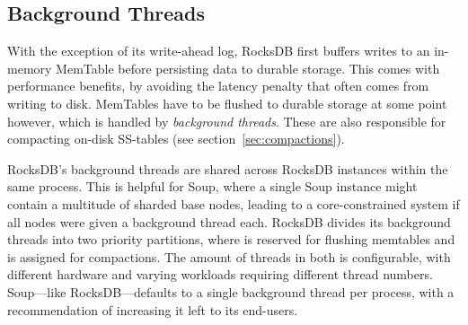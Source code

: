 \subsection{Background Threads}

With the exception of its write-ahead log, RocksDB first buffers writes to an
in-memory MemTable before persisting data to durable storage. This comes with
performance benefits, by avoiding the latency penalty that often comes from
writing to disk. MemTables have to be flushed to durable storage at some point
however, which is handled by \textit{background threads}. These are also
responsible for compacting on-disk SS-tables (see
section~\ref{sec:compactions}).

RocksDB's background threads are shared across RocksDB instances within the same
process. This is helpful for Soup, where a single Soup instance might contain a
multitude of sharded base nodes, leading to a core-constrained system if all
nodes were given a background thread each. RocksDB divides its background
threads into two priority partitions, where  is reserved for flushing
memtables and  is assigned for compactions. The amount of threads in
both is configurable, with different hardware and varying workloads requiring
different thread numbers. Soup---like RocksDB---defaults to a single background
thread per process, with a recommendation of increasing it left to its
end-users.
